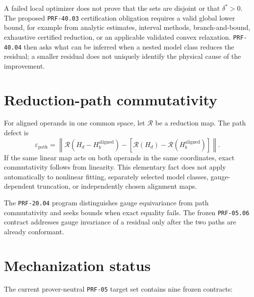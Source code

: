 A failed local optimizer does not prove that the sets are disjoint or that
$\delta^{\ast}>0$. The proposed \texttt{PRF-40.03} certification obligation
requires a valid global lower bound, for example from analytic estimates,
interval methods, branch-and-bound, exhaustive certified reduction, or an
applicable validated convex relaxation. \texttt{PRF-40.04} then asks what can be
inferred when a nested model class reduces the residual; a smaller residual does
not uniquely identify the physical cause of the improvement.

\section{Reduction-path commutativity}

For aligned operands in one common space, let $\mathcal R$ be a reduction map.
The path defect is
\begin{equation}
  \varepsilon_{\mathrm{path}}
  =
  \left\|
    \mathcal R(H_d-H_b^{\mathrm{aligned}})
    -
    [\mathcal R(H_d)-\mathcal R(H_b^{\mathrm{aligned}})]
  \right\|.
\end{equation}
If the same linear map acts on both operands in the same coordinates, exact
commutativity follows from linearity. This elementary fact does not apply
automatically to nonlinear fitting, separately selected model classes,
gauge-dependent truncation, or independently chosen alignment maps.

The \texttt{PRF-20.04} program distinguishes gauge equivariance from path
commutativity and seeks bounds when exact equality fails. The frozen
\texttt{PRF-05.06} contract addresses gauge invariance of a residual only after
the two paths are already conformant.

\section{Mechanization status}

The current prover-neutral \texttt{PRF-05} target set contains nine frozen
contracts:

